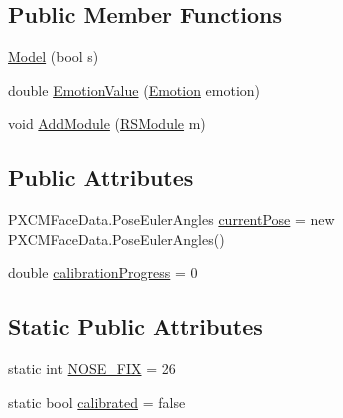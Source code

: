 \subsection*{Public Member Functions}
\begin{DoxyCompactItemize}
\item 
\hyperlink{class_real_sense_1_1_model_a39349d1d9b1274a9fe28614e9ce215f3}{Model} (bool s)
\item 
double \hyperlink{class_real_sense_1_1_model_a078b1ddb43e777aa73c1b3898722e4bb}{Emotion\+Value} (\hyperlink{class_real_sense_1_1_model_a5bf3fde8f53519f7a740d8b4e0399208}{Emotion} emotion)
\item 
void \hyperlink{class_real_sense_1_1_model_a8b8bff51e69b2b33f5c8cfb007c424e5}{Add\+Module} (\hyperlink{class_real_sense_1_1_r_s_module}{R\+S\+Module} m)
\end{DoxyCompactItemize}
\subsection*{Public Attributes}
\begin{DoxyCompactItemize}
\item 
P\+X\+C\+M\+Face\+Data.\+Pose\+Euler\+Angles \hyperlink{class_real_sense_1_1_model_aa6e241f22bac2dbdefdceef6e4cf0202}{current\+Pose} = new P\+X\+C\+M\+Face\+Data.\+Pose\+Euler\+Angles()
\item 
double \hyperlink{class_real_sense_1_1_model_a8573a7d01db1fb8a29f5873a717373bc}{calibration\+Progress} = 0
\end{DoxyCompactItemize}
\subsection*{Static Public Attributes}
\begin{DoxyCompactItemize}
\item 
static int \hyperlink{class_real_sense_1_1_model_a2f289c39689e5de8feeb82dcfb708170}{N\+O\+S\+E\+\_\+\+F\+IX} = 26
\item 
static bool \hyperlink{class_real_sense_1_1_model_af0a605c0cc3c8739836a4e98ac06b864}{calibrated} = false
\end{DoxyCompactItemize}
